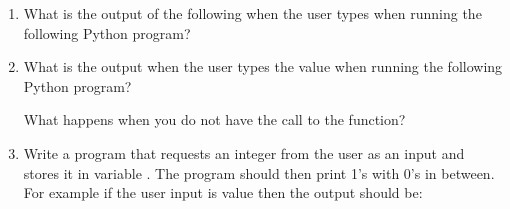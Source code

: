 \documentclass[letterpaper,10pt,english]{sphinxmanual}
\begin{document}
\begin{enumerate}
\item {} 
What is the output of the following when the user types  when
running the following Python program?

\begin{sphinxVerbatim}[commandchars=\\\{\}]
  
    
  
  
 
\end{sphinxVerbatim}

\item {} 
What is the output when the user types the value  when running
the following Python program?

\begin{sphinxVerbatim}[commandchars=\\\{\}]
  
    
    
    
\end{sphinxVerbatim}

What happens when you do not have the call to the  function?

\item {} 
Write a program that requests an integer from the user as an input
and stores it in variable .  The program should then print
 1’s with 0’s in between.  For example if the user input is
value  then the output should be:

\begin{sphinxVerbatim}[commandchars=\\\{\}]
\end{sphinxVerbatim}

\end{enumerate}
\end{document}
